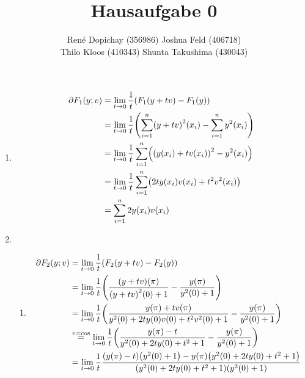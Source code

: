 \documentclass{exercise}
\title{Hausaufgabe 0}
\author{René Dopichay (356986) \quad Joshua Feld (406718)\\Thilo Kloos (410343) \quad Shunta Takushima (430043)}
\begin{document}
	\maketitle


	\section{}

	\begin{enumerate}
		\item
		\begin{align*}
			\partial F_1\parentheses*{y; v} &= \lim_{t \to 0}\frac{1}{t}\parentheses*{F_1\parentheses*{y + tv} - F_1\parentheses*{y}}\\
			&= \lim_{t \to 0}\frac{1}{t}\parentheses*{\sum_{i = 1}^n \parentheses*{y + tv}^2\parentheses*{x_i} - \sum_{i = 1}^n y^2\parentheses*{x_i}}\\
			&= \lim_{t \to 0}\frac{1}{t}\sum_{i = 1}^n \parentheses*{\parentheses*{y\parentheses*{x_i} + tv\parentheses*{x_i}}^2 - y^2\parentheses*{x_i}}\\
			&= \lim_{t \to 0}\frac{1}{t}\sum_{i = 1}^n \parentheses*{2ty\parentheses*{x_i}v\parentheses*{x_i} + t^2 v^2\parentheses*{x_i}}\\
			&= \sum_{i = 1}^n 2y\parentheses*{x_i}v\parentheses*{x_i}
		\end{align*}
		\item
		\begin{enumerate}
			\item
			\begin{align*}
				\partial F_2\parentheses*{y; v} &= \lim_{t \to 0}\frac{1}{t}\parentheses*{F_2\parentheses*{y + tv} - F_2\parentheses*{y}}\\
				&= \lim_{t \to 0}\frac{1}{t}\parentheses*{\frac{\parentheses*{y + tv}\parentheses*{\pi}}{\parentheses*{y + tv}^2\parentheses*{0} + 1} - \frac{y\parentheses*{\pi}}{y^2\parentheses*{0} + 1}}\\
				&= \lim_{t \to 0}\frac{1}{t}\parentheses*{\frac{y\parentheses*{\pi} + tv\parentheses*{\pi}}{y^2\parentheses*{0} + 2ty\parentheses*{0}v\parentheses*{0} + t^2 v^2\parentheses*{0} + 1} - \frac{y\parentheses*{\pi}}{y^2\parentheses*{0} + 1}}\\
				&\stackrel{v = \cos}{=}\lim_{t \to 0}\frac{1}{t}\parentheses*{\frac{y\parentheses*{\pi} - t}{y^2\parentheses*{0} + 2ty\parentheses*{0} + t^2 + 1} - \frac{y\parentheses*{\pi}}{y^2\parentheses*{0} + 1}}\\
				&= \lim_{t \to 0}\frac{1}{t}\frac{\parentheses*{y\parentheses*{\pi} - t}\parentheses*{y^2\parentheses*{0} + 1} - y\parentheses*{\pi}\parentheses*{y^2\parentheses*{0} + 2ty\parentheses*{0} + t^2 + 1}}{\parentheses*{y^2\parentheses*{0} + 2ty\parentheses*{0} + t^2 + 1}\parentheses*{y^2\parentheses*{0} + 1}}\\

\end{align*}
\end{enumerate}
\end{enumerate}
\end{document}

